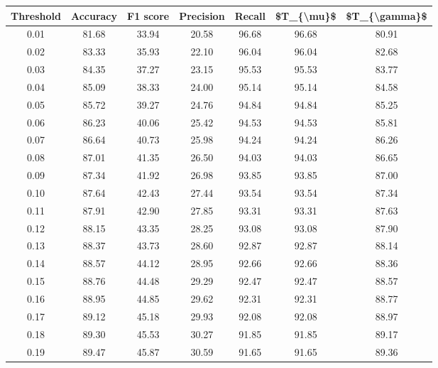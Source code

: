 \begin{tabular}{|c|c|c|c|c|c|c|}
\hline
 Threshold &  Accuracy &  F1 score &  Precision &  Recall &  \$T\_\{\textbackslash mu\}\$ &  \$T\_\{\textbackslash gamma\}\$ \\
\hline
      0.01 &     81.68 &     33.94 &      20.58 &   96.68 &      96.68 &         80.91 \\
      0.02 &     83.33 &     35.93 &      22.10 &   96.04 &      96.04 &         82.68 \\
      0.03 &     84.35 &     37.27 &      23.15 &   95.53 &      95.53 &         83.77 \\
      0.04 &     85.09 &     38.33 &      24.00 &   95.14 &      95.14 &         84.58 \\
      0.05 &     85.72 &     39.27 &      24.76 &   94.84 &      94.84 &         85.25 \\
      0.06 &     86.23 &     40.06 &      25.42 &   94.53 &      94.53 &         85.81 \\
      0.07 &     86.64 &     40.73 &      25.98 &   94.24 &      94.24 &         86.26 \\
      0.08 &     87.01 &     41.35 &      26.50 &   94.03 &      94.03 &         86.65 \\
      0.09 &     87.34 &     41.92 &      26.98 &   93.85 &      93.85 &         87.00 \\
      0.10 &     87.64 &     42.43 &      27.44 &   93.54 &      93.54 &         87.34 \\
      0.11 &     87.91 &     42.90 &      27.85 &   93.31 &      93.31 &         87.63 \\
      0.12 &     88.15 &     43.35 &      28.25 &   93.08 &      93.08 &         87.90 \\
      0.13 &     88.37 &     43.73 &      28.60 &   92.87 &      92.87 &         88.14 \\
      0.14 &     88.57 &     44.12 &      28.95 &   92.66 &      92.66 &         88.36 \\
      0.15 &     88.76 &     44.48 &      29.29 &   92.47 &      92.47 &         88.57 \\
      0.16 &     88.95 &     44.85 &      29.62 &   92.31 &      92.31 &         88.77 \\
      0.17 &     89.12 &     45.18 &      29.93 &   92.08 &      92.08 &         88.97 \\
      0.18 &     89.30 &     45.53 &      30.27 &   91.85 &      91.85 &         89.17 \\
      0.19 &     89.47 &     45.87 &      30.59 &   91.65 &      91.65 &         89.36 \\

\end{tabular}
